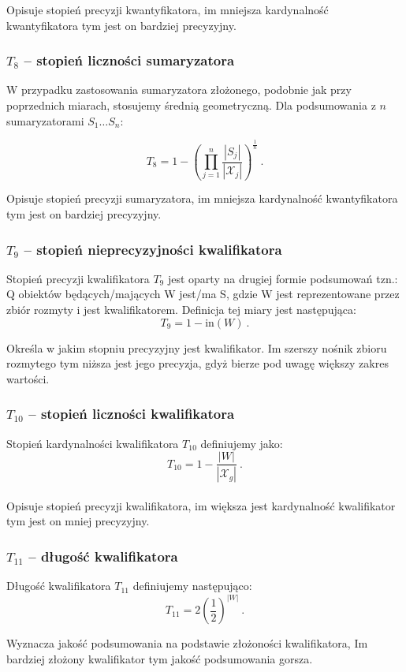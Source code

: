 \documentclass{classrep}
\begin{document}
Opisuje stopień precyzji kwantyfikatora, im mniejsza kardynalność kwantyfikatora tym jest on bardziej precyzyjny.

\subsubsection{\(T_8\) -- stopień liczności sumaryzatora}
W przypadku zastosowania sumaryzatora złożonego, podobnie jak przy poprzednich miarach, stosujemy średnią geometryczną.
Dla podsumowania z \(n\) sumaryzatorami \(S_1 \ldots S_n\):

\[T_8 = 1- \left(\prod_{j=1}^{n} \frac{|S_j|}{|\mathcal{X}_j|}\right)^{\frac{1}{n}} ~\mbox{.}\]

Opisuje stopień precyzji sumaryzatora, im mniejsza kardynalność kwantyfikatora tym jest on bardziej precyzyjny.

\subsubsection{\(T_9\) -- stopień nieprecyzyjności kwalifikatora}
Stopień precyzji kwalifikatora \(T_9\) jest oparty na drugiej formie podsumowań tzn.: Q obiektów będących/mających W jest/ma S, gdzie W jest reprezentowane przez zbiór rozmyty i jest kwalifikatorem. Definicja tej miary jest następująca:
\[T_9 = 1-\mathrm{in}(W) ~\mbox{.}\]

Określa w jakim stopniu precyzyjny jest kwalifikator. Im szerszy nośnik zbioru rozmytego tym niższa jest jego precyzja, gdyż bierze pod uwagę większy zakres wartości. 


\subsubsection{\(T_{10}\) -- stopień liczności kwalifikatora}
Stopień kardynalności kwalifikatora \(T_{10}\) definiujemy jako:
\[T_{10} = 1-\frac{|W|}{|\mathcal{X}_g|} ~\mbox{.}\]\\

Opisuje stopień precyzji kwalifikatora, im większa jest kardynalność kwalifikator tym jest on mniej precyzyjny.

\subsubsection{\(T_{11}\) -- długość kwalifikatora}
Długość kwalifikatora \(T_{11}\) definiujemy następująco:
\[T_{11} = 2\left(\frac{1}{2}\right)^{|W|} ~\mbox{.}\]

Wyznacza jakość podsumowania na podstawie złożoności kwalifikatora, Im bardziej złożony kwalifikator tym jakość podsumowania gorsza.
\end{document}
